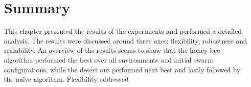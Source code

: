 \section{Summary}
\label{results:summary}

This chapter presented the results of the experiments and performed a detailed analysis. The results were discussed around three axes: flexibility, robustness and scalability. An overview of the results seems to show that the honey bee algorithm performed the best over all environments and initial swarm configurations, while the desert ant performed next best and lastly followed by the na\"ive algorithm. Flexibility addressed 


